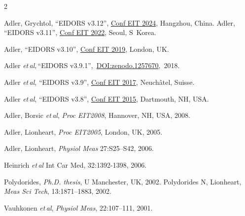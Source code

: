 \documentclass[10pt,a4paper]{article}
\renewenvironment{thebibliography}[1]{%
\begin{oldthebibliography}{#1}%
	\setlength{\parskip}{0ex}%
	\setlength{\itemsep}{0ex}%
}
{
	\end{oldthebibliography}%
}
\begin{document}
\begin{multicols}{2}
\begin{thebibliography}{}
   Adler, Grychtol, ``EIDORS v3.12'',
\href{http://dx.doi.org/10.5281/zenodo.13316995}{Conf EIT 2024}, Hangzhou, China.
   Adler, ``EIDORS v3.11'',
\href{http://dx.doi.org/10.5281/zenodo.7495740}{Conf EIT 2022}, Seoul, S~Korea.

   Adler, ``EIDORS v3.10'',
   \href{http://dx.doi.org/10.5281/zenodo.3247168}{Conf EIT 2019}, London, UK.

   Adler {\em et\,al},\,``EIDORS v3.9.1'',\,%
   \href{http://dx.doi.org/10.5281/zenodo.1257670}{DOI:zenodo.1257670},\,%
    2018.

   Adler {\em et\,al}, ``EIDORS v3.9'',
   \href{http://dx.doi.org/10.5281/zenodo.583266}{Conf EIT 2017}, Neuchâtel, Suisse.


   Adler {\em et\,al}, ``EIDORS v3.8'',
   \href{http://dx.doi.org/10.5281/zenodo.17559}{Conf EIT 2015}, Dartmouth, NH, USA.

Adler, Borsic {\em et\,al},
{\em Proc EIT2008}, Hannover, NH, USA, 2008.


Adler, Lionheart,
{\em Proc EIT2005}, London, UK, 2005.

%
Adler, Lionheart,
{\em Physiol Meas} 27:S25--S42, 2006.

Heinrich {\em et\,al} Int Car Med, 32:1392-1398, 2006.

   Polydorides,
 {\em Ph.D. thesis}, U Manchester, UK, 2002.
   Polydorides N, Lionheart, %
   {\em Meas Sci Tech}, 13:1871--1883, 2002.

   Vauhkonen  {\em  et\,al},
   {\em  Physiol Meas}, 22:107--111, 2001.

\end{thebibliography}
\end{multicols}
\end{document}
